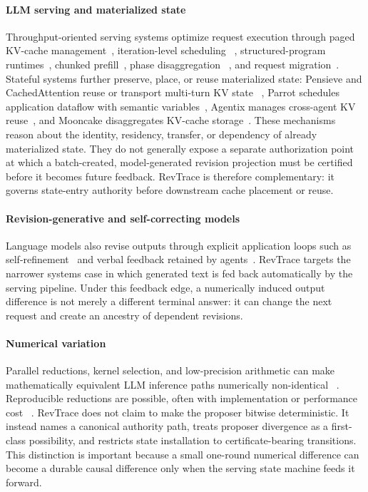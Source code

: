\paragraph{LLM serving and materialized state}
Throughput-oriented serving systems optimize request execution through paged
KV-cache management~\cite{kwon2023vllm}, iteration-level scheduling
~\cite{yu2022orca}, structured-program runtimes~\cite{zheng2024sglang},
chunked prefill~\cite{agrawal2024sarathi}, phase disaggregation
~\cite{zhong2024distserve}, and request migration~\cite{sun2024llumnix}.
Stateful systems further preserve, place, or reuse materialized state:
Pensieve and CachedAttention reuse or transport multi-turn KV state
~\cite{yu2025pensieve,gao2024cachedattention}, Parrot schedules application
dataflow with semantic variables~\cite{lin2024parrot}, Agentix manages
cross-agent KV reuse~\cite{luo2026agentix}, and Mooncake disaggregates KV-cache
storage~\cite{qin2024mooncake}. These mechanisms reason about the identity,
residency, transfer, or dependency of already materialized state. They do not
generally expose a separate authorization point at which a batch-created,
model-generated revision projection must be certified before it becomes
future feedback. RevTrace is therefore complementary: it governs state-entry
authority before downstream cache placement or reuse.

\paragraph{Revision-generative and self-correcting models}
Language models also revise outputs through explicit application loops such as
self-refinement~\cite{madaan2023selfrefine} and verbal feedback retained by
agents~\cite{shinn2023reflexion}. RevTrace targets the narrower systems case in
which generated text is fed back automatically by the serving pipeline. Under
this feedback edge, a numerically induced output difference is not merely a
different terminal answer: it can change the next request and create an
ancestry of dependent revisions.

\paragraph{Numerical variation}
Parallel reductions, kernel selection, and low-precision arithmetic can make
mathematically equivalent LLM inference paths numerically non-identical
~\cite{yuan2025numerical,antunes2024reprohpc}. Reproducible reductions are
possible, often with implementation or performance cost
~\cite{demmel2013reprosum,mueller2018reproagg}. RevTrace does not claim to make
the proposer bitwise deterministic. It instead names a canonical authority
path, treats proposer divergence as a first-class possibility, and restricts
state installation to certificate-bearing transitions. This distinction is
important because a small one-round numerical difference can become a durable
causal difference only when the serving state machine feeds it forward.

